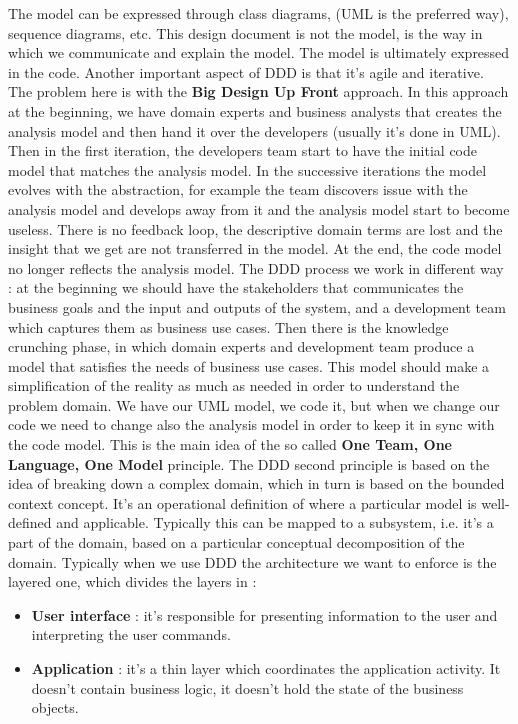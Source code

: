 \documentclass[11pt]{article}
\begin{document}
\begin{appendix}
The model can be expressed through class diagrams, (UML is the preferred way), sequence diagrams, etc. This design document is not the model, is the way in which we communicate and explain the model. The model is ultimately expressed in the code. Another important aspect of DDD is that it's agile and iterative. The problem here is with the \textbf{Big Design Up Front} approach. In this approach at the beginning, we have domain experts and business analysts that creates the analysis model and then hand it over the developers (usually it's done in UML). Then in the first iteration, the developers team start to have the initial code model that matches the analysis model. In the successive iterations the model evolves with the abstraction, for example the team discovers issue with the analysis model and develops away from it and the analysis model start to become useless. There is no feedback loop, the descriptive domain terms are lost and the insight that we get are not transferred in the model. At the end, the code model no longer reflects the analysis model. The DDD process we work in different way : at the beginning we should have the stakeholders that communicates the business goals and the input and outputs of the system, and a development team which captures them as business use cases. Then there is the knowledge crunching phase, in which domain experts and development team produce a model that satisfies the needs of business use cases. This model should make a simplification of the reality as much as needed in order to understand the problem domain. We have our UML model, we code it, but when we change our code we need to change also the analysis model in order to keep it in sync with the code model. This is the main idea of the so called \textbf{One Team, One Language, One Model} principle. The DDD second principle is based on the idea of breaking down a complex domain, which in turn is based on the bounded context concept. It's an operational definition of where a particular model is well-defined and applicable. Typically this can be mapped to a subsystem, i.e. it's a part of the domain, based on a particular conceptual decomposition of the domain. Typically when we use DDD the architecture we want to enforce is the layered one, which divides the layers in :
\begin{itemize}
\item \textbf{User interface} : it's responsible for presenting information to the user and interpreting the user commands.
\item \textbf{Application} : it's a thin layer which coordinates  the application activity. It doesn't contain business logic, it doesn't hold the state of the business objects.

\end{itemize}
\end{appendix}
\end{document}
